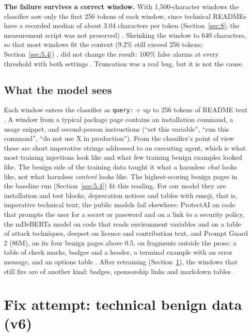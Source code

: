 \documentclass[11pt]{article}
\newcommand{\code}[1]{\texttt{#1}}
\begin{document}
\textbf{The failure survives a correct window.} With 1,500-character windows the classifier saw only the first 256 tokens of each window, since technical READMEs have a recorded median of about 3.04 characters per token (Section~\ref{sec:8}; the measurement script was not preserved)%
. Shrinking the window to 640 characters, so that most windows fit the context (9.2\% still exceed 256 tokens; Section~\ref{sec:5.4})%
, did not change the result: 100\% false alarms at every threshold with both settings%
. Truncation was a real bug, but it is not the cause.

\subsection{What the model sees}\label{sec:6.3}

Each window enters the classifier as \code{query:\textvisiblespace{}} + up to 256 tokens of README text%
. A window from a typical package page contains an installation command, a usage snippet, and second-person instructions (``set this variable'', ``run this command'', ``do not use X in production''). From the classifier's point of view these are short imperative strings addressed to an executing agent, which is what most training injections look like and what few training benign examples looked like. The benign side of the training data taught it what a harmless \emph{chat} looks like, not what harmless \emph{content} looks like. The highest-scoring benign pages in the baseline run (Section~\ref{sec:5.4}) fit this reading. For our model they are installation and test blocks, deprecation notices and tables with emoji, that is, imperative technical text; the public models fail elsewhere: ProtectAI on code that prompts the user for a secret or password and on a link to a security policy, the mDeBERTa model on code that reads environment variables and on a table of attack techniques, deepset on licence and contribution text, and Prompt Guard 2 (86M), on its four benign pages above 0.5, on fragments outside the prose: a table of check marks, badges and a header, a terminal example with an error message, and an options table%
. After retraining (Section~\ref{sec:7}), the windows that still fire are of another kind: badges, sponsorship links and markdown tables%
.

\section{Fix attempt: technical benign data (v6)}\label{sec:7}
\end{document}
